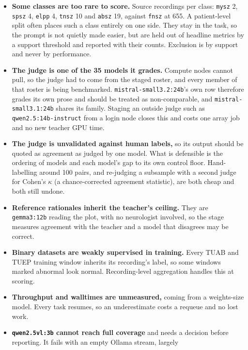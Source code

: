 \documentclass[11pt,a4paper]{article}
\begin{document}
\begin{itemize}
\item \textbf{Some classes are too rare to score.} Source recordings per class:
      \texttt{mysz} 2, \texttt{spsz} 4, \texttt{elpp} 4, \texttt{tnsz} 10 and
      \texttt{absz} 19, against \texttt{fnsz} at 655. A patient-level split often
      places such a class entirely on one side. They stay in the task, so the
      prompt is not quietly made easier, but are held out of headline metrics by a
      support threshold and reported with their counts. Exclusion is by support
      and never by performance.
\item \textbf{The judge is one of the 35 models it grades.} Compute nodes cannot
      pull, so the judge had to come from the staged roster, and every member of
      that roster is being benchmarked. \texttt{mistral-small3.2:24b}'s own row
      therefore grades its own prose and should be treated as non-comparable, and
      \texttt{mistral-small3.1:24b} shares its family. Staging an outside judge
      such as \texttt{qwen2.5:14b-instruct} from a login node closes this and
      costs one array job and no new teacher GPU time.
\item \textbf{The judge is unvalidated against human labels,} so its output should
      be quoted as agreement as judged by one model. What is defensible is the
      ordering of models and each model's gap to its own control floor.
      Hand-labelling around 100 pairs, and re-judging a subsample with a second
      judge for Cohen's $\kappa$ (a chance-corrected agreement statistic), are
      both cheap and both still undone.
\item \textbf{Reference rationales inherit the teacher's ceiling.} They are
      \texttt{gemma3:12b} reading the plot, with no neurologist involved, so the
      stage measures agreement with the teacher and a model that disagrees may be
      correct.
\item \textbf{Binary datasets are weakly supervised in training.} Every TUAB and
      TUEP training window inherits its recording's label, so some windows marked
      abnormal look normal. Recording-level aggregation handles this at scoring.
\item \textbf{Throughput and walltimes are unmeasured,} coming from a
      weights-size model. Every task resumes, so an underestimate costs a requeue
      and no lost work.
\item \textbf{\texttt{qwen2.5vl:3b} cannot reach full coverage} and needs a
      decision before reporting. It fails with an empty Ollama stream, largely

\end{itemize}
\end{document}

